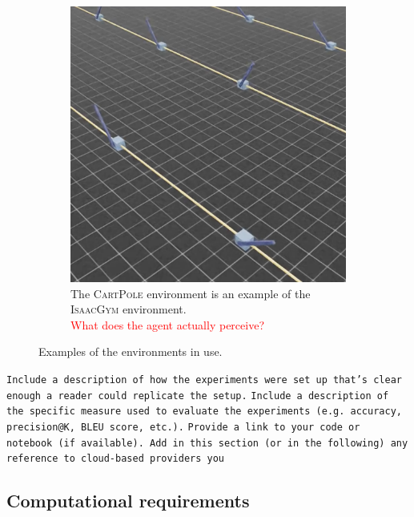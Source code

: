 \documentclass[10pt]{article} %
\begin{document}
\begin{figure}
\begin{subfigure}[b]{0.32\textwidth}
    \label{fig:sample-env-atari}
  \end{subfigure}
  \hfill
  \begin{subfigure}[b]{0.32\textwidth}
    \centering
    \includegraphics[width=\textwidth]{figures/isaac.png}
    \caption{The \textsc{CartPole} environment is an example of the \textsc{IsaacGym} environment.\\\textcolor{red}{What does the agent actually perceive?}\\}
    \label{fig:sample-env-isaac}
  \end{subfigure}
  \caption{Examples of the environments in use.}
  \label{fig:environmnents}
\end{figure}

\texttt{Include a description of how the experiments were set up that's clear enough a reader could replicate the setup.}
\texttt{Include a description of the specific measure used to evaluate the experiments (e.g. accuracy, precision@K, BLEU score, etc.).}
\texttt{Provide a link to your code or notebook (if available). Add in this section (or in the following) any reference to cloud-based providers you}

\subsection{Computational requirements}
\end{document}
